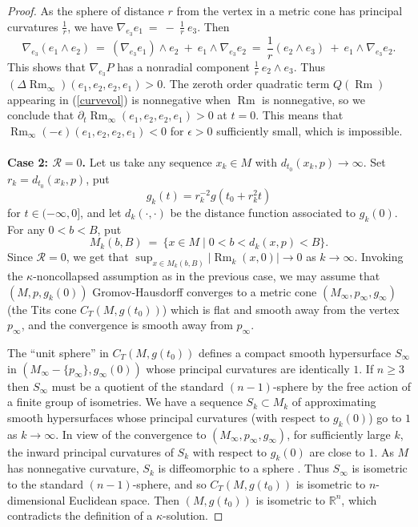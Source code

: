 \documentclass[12pt]{amsart}
\newcommand{\R}{{\mathbb R}}
\newcommand{\Rm}{\operatorname{Rm}}
\newcommand{\ctits}{C_T}
\newcommand{\eps}{\epsilon}
\newcommand{\ra}{\rightarrow}
\numberwithin{equation}{section}
\theoremstyle{plain}
\theoremstyle{definition}
\theoremstyle{remark}
\begin{document}
\begin{proof}
As the sphere of distance $r$ from the vertex in a metric cone has 
principal curvatures $\frac{1}{r}$, we have
$\nabla_{e_3} e_1 \: = \: - \: \frac{1}{r} \: e_3$.
Then
\begin{equation}
\nabla_{e_3} (e_1 \wedge e_2) \: = \:
\left( \nabla_{e_3} e_1 \right) \wedge e_2 \: + \:
e_1 \wedge \nabla_{e_3} e_2 \: = \: \frac{1}{r} \left( e_2 \wedge e_3 \right) \: + \: 
e_1 \wedge \nabla_{e_3} e_2.
\end{equation}
This shows that $\nabla_{e_3} P$ has a nonradial component
$\frac{1}{r} \: e_2 \wedge e_3$. Thus
$(\Delta \Rm_\infty)(e_1,e_2,e_2,e_1)>0$. 
The zeroth order quadratic term $Q(\Rm)$ appearing in (\ref{curvevol})
is nonnegative when $\Rm$ is nonnegative, so we conclude that 
$\partial_t\Rm_\infty(e_1,e_2,e_2,e_1)>0$ at $t=0$.  This means that
$\Rm_\infty(-\eps)(e_1,e_2,e_2,e_1)<0$ for $\eps>0$ sufficiently small,
which is impossible. \\ \\
{\bf Case 2: ${\mathcal R}=0$.}   
Let us take any sequence $x_k\in M$ with 
$d_{t_0}(x_k,p)\ra \infty$.  Set $r_k = d_{t_0}(x_k,p)$, put
\begin{equation}
g_k(t) =  r_k^{-2}g(t_0 + r_k^2 t)
\end{equation}
for $t\in (-\infty,0]$, and let $d_k(\cdot, \cdot)$ be the distance function
associated to $g_k(0)$.
For any $0<b<B$, put
\begin{equation}
M_k(b,B) \: = \: \{x\in M\mid 0<b<d_k(x,p)<B\}.
\end{equation}
Since ${\mathcal R}=0$, we get that $\sup_{x\in M_k(b,B)}|\Rm_k(x,0)|\ra 0$
as $k\ra\infty$.  Invoking the $\kappa$-noncollapsed assumption as in
the previous case, we
may assume that $(M,p,g_k(0))$ Gromov-Hausdorff converges to a metric
cone $(M_\infty,p_\infty,g_\infty)$ (the Tits cone $\ctits(M,g(t_0))$)
which is flat and smooth away from the
vertex $p_\infty$, and the convergence is smooth away from $p_\infty$.

The ``unit sphere'' in $\ctits(M,g(t_0))$
defines a compact smooth hypersurface $S_\infty$
in $(M_\infty - \{p_\infty\},g_\infty(0))$ whose principal curvatures
are identically $1$. If $n \ge 3$ then $S_\infty$ must be a quotient of
the standard $(n-1)$-sphere by the free action of a finite group of
isometries. We have a sequence $S_k\subset M_k$
of approximating smooth hypersurfaces whose principal curvatures
(with respect to $g_k(0)$) go to $1$ as $k\ra\infty$.  In view of the
convergence to $(M_\infty,p_\infty,g_\infty)$, for 
sufficiently large $k$,
the inward principal curvatures of $S_k$ with respect to $g_k(0)$
are close to $1$. As $M$ has nonnegative curvature,
$S_k$ is diffeomorphic to a sphere \cite[Theorem A]{Eschenburg}.
Thus $S_\infty$ is isometric to the standard $(n-1)$-sphere, 
and so 
$\ctits(M,g(t_0))$ is isometric to $n$-dimensional Euclidean space.
Then  $(M,g(t_0))$ is isometric to $\R^n$, which 
contradicts the definition of a $\kappa$-solution.


\end{proof}
\end{document}
